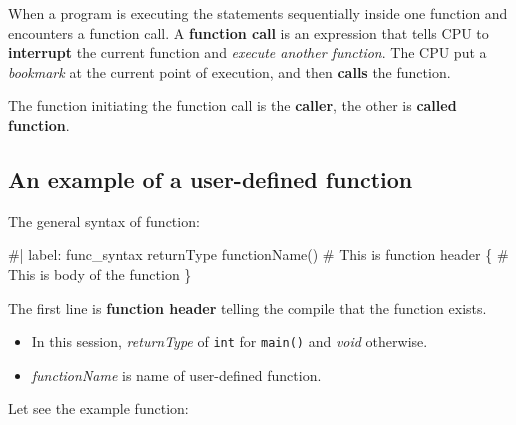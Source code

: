 \documentclass[
  letterpaper,
  DIV=11,
  numbers=noendperiod]{scrreprt}
\newenvironment{Shaded}{\begin{snugshade}}{\end{snugshade}}
\newcommand{\CommentTok}[1]{\textcolor[rgb]{0.37,0.37,0.37}{#1}}
\newcommand{\FunctionTok}[1]{\textcolor[rgb]{0.28,0.35,0.67}{#1}}
\newcommand{\NormalTok}[1]{\textcolor[rgb]{0.00,0.23,0.31}{#1}}
\providecommand{\tightlist}{%
  \setlength{\itemsep}{0pt}\setlength{\parskip}{0pt}}\usepackage{longtable,booktabs,array}
\begin{document}
When a program is executing the statements sequentially inside one
function and encounters a function call. A \textbf{function call} is an
expression that tells CPU to \textbf{interrupt} the current function and
\emph{execute another function}. The CPU put a \emph{bookmark} at the
current point of execution, and then \textbf{calls} the function.

The function initiating the function call is the \textbf{caller}, the
other is \textbf{called function}.

\hypertarget{an-example-of-a-user-defined-function}{%
\subsection{An example of a user-defined
function}\label{an-example-of-a-user-defined-function}}

The general syntax of function:

\begin{Shaded}
\begin{Highlighting}[]
\CommentTok{\#| label: func\_syntax}
\NormalTok{returnType }\FunctionTok{functionName}\NormalTok{() }\CommentTok{\# This is function header}
\NormalTok{\{}
  \CommentTok{\# This is body of the function}
\NormalTok{\}}
\end{Highlighting}
\end{Shaded}

The first line is \textbf{function header} telling the compile that the
function exists.

\begin{itemize}
\tightlist
\item
  In this session, \emph{returnType} of \texttt{int} for \texttt{main()}
  and \emph{void} otherwise.
\item
  \emph{functionName} is name of user-defined function.
\end{itemize}

Let see the example function:
\end{document}
